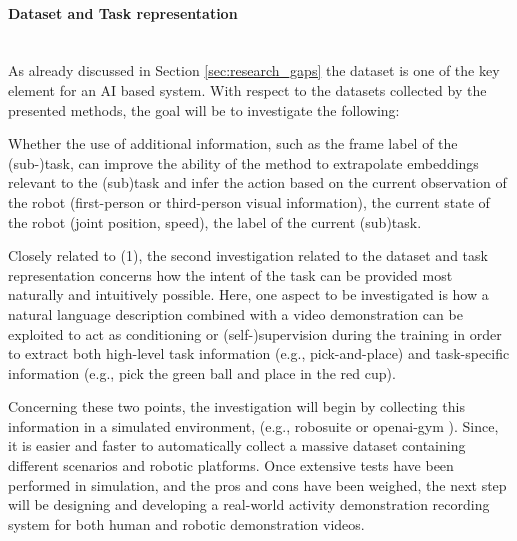 \paragraph{Dataset and Task representation} \mbox{} \\
As already discussed in Section \ref{sec:research_gaps} the dataset is one of the key element for an AI based system. With respect to the datasets collected by the presented methods, the goal will be to investigate the following:
    \begin{enumerate*}[label=\textbf{(\arabic*)}]
    \item Whether the use of additional information, such as the frame label of the (sub-)task, can improve the ability of the method to extrapolate embeddings relevant to the (sub)task and infer the action based on the current observation of the robot (first-person or third-person visual information), the current state of the robot (joint position, speed), the label of the current (sub)task. 
    \item Closely related to (1), the second investigation related to the dataset and task representation concerns how the intent of the task can be provided most naturally and intuitively possible. Here, one aspect to be investigated is how a natural language description combined with a video demonstration can be exploited to act as conditioning or (self-)supervision during the training in order to extract both high-level task information (e.g., pick-and-place) and task-specific information (e.g., pick the green ball and place in the red cup).
    \end{enumerate*} Concerning these two points, the investigation will begin by collecting this information in a simulated environment, (e.g., robosuite \cite{zhu2020robosuite} or openai-gym \cite{brockman2016openai}). Since, it is easier and faster to automatically collect a massive dataset containing different scenarios and robotic platforms. Once extensive tests have been performed in simulation, and the pros and cons have been weighed, the next step will be designing and developing a real-world activity demonstration recording system for both human and robotic demonstration videos.  

